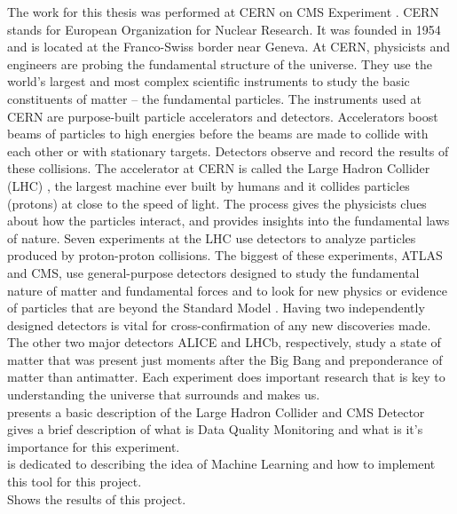 
The work for this thesis was performed at CERN \cite{What_is_CERN} on CMS Experiment \cite{What_is_CMS}. CERN stands for European Organization for Nuclear Research. 
It was founded in 1954 and is located at the Franco-Swiss border near Geneva. At CERN, physicists and engineers are probing the fundamental structure of the universe. They use the world's largest and most complex scientific instruments to study the basic constituents of matter – the fundamental particles. The instruments used at CERN are purpose-built particle accelerators and detectors. Accelerators boost beams of particles to high energies before the beams are made to collide with each other or with stationary targets. Detectors observe and record the results of these collisions. The accelerator at CERN is called the Large Hadron Collider (LHC) \cite{What_is_LHC}, the largest machine ever built by humans and it collides particles (protons) at close to the speed of light. The process gives the physicists clues about how the particles interact, and provides insights into the fundamental laws of nature. Seven experiments at the LHC use detectors to analyze particles produced by proton-proton collisions. The biggest of these experiments, ATLAS\cite{What_is_ATLAS} and CMS, use general-purpose detectors designed to study the fundamental nature of matter and fundamental forces and to look for new physics or evidence of particles that are beyond the Standard Model \cite{What_is_SM} . Having two independently designed detectors is vital for cross-confirmation of any new discoveries made. The other two major detectors ALICE\cite{What_is_ALICE} and LHCb\cite{What_is_LHCb}, respectively, study a state of matter that was present just moments after the Big Bang and preponderance of matter than antimatter.  Each experiment does important research that is key to understanding the universe that surrounds and makes us.\\

 presents a basic description of the Large Hadron Collider and CMS Detector\\

 gives a brief description of what is Data Quality Monitoring and what is it's importance for this experiment. \\

 is dedicated to describing the idea of Machine Learning and how to implement this tool for this project.\\

 Shows the results of this project.\\
